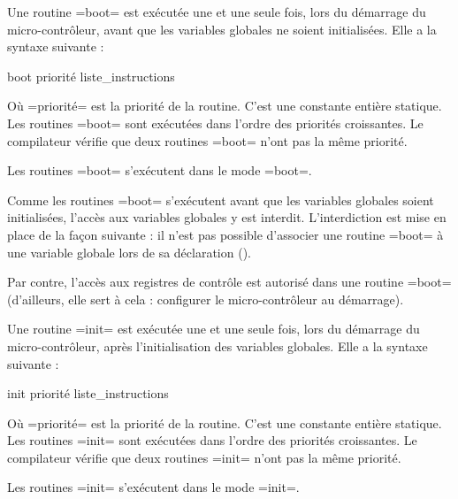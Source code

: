 
Une routine \plm=boot= est exécutée une et une seule fois, lors du démarrage du micro-contrôleur, avant que les variables globales ne soient initialisées. Elle a la syntaxe suivante :
\begin{PLM}
boot priorité {
  liste_instructions
}
\end{PLM}
Où \plm=priorité= est la priorité de la routine. C'est une constante entière statique. Les routines \plm=boot= sont exécutées dans l'ordre des priorités croissantes. Le compilateur vérifie que deux routines \plm=boot= n'ont pas la même priorité.

Les routines \plm=boot= s'exécutent dans le mode \plm=boot=.

Comme les routines \plm=boot= s'exécutent avant que les variables globales soient initialisées, l'accès aux variables globales y est interdit. L'interdiction est mise en place de la façon suivante : il n'est pas possible d'associer une routine \plm=boot= à une variable globale lors de sa déclaration ().

Par contre, l'accès aux registres de contrôle est autorisé dans une routine \plm=boot= (d'ailleurs, elle sert à cela : configurer le micro-contrôleur au démarrage).








Une routine \plm=init= est exécutée une et une seule fois, lors du démarrage du micro-contrôleur, après l'initialisation des variables globales. Elle a la syntaxe suivante :
\begin{PLM}
init priorité {
  liste_instructions
}
\end{PLM}
Où \plm=priorité= est la priorité de la routine. C'est une constante entière statique. Les routines \plm=init= sont exécutées dans l'ordre des priorités croissantes. Le compilateur vérifie que deux routines \plm=init= n'ont pas la même priorité.

Les routines \plm=init= s'exécutent dans le mode \plm=init=.

